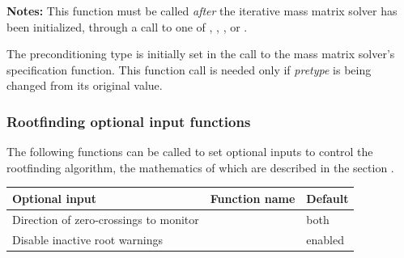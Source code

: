 \documentclass[letterpaper,10pt,english]{sphinxmanual}
\begin{document}
\begin{fulllineitems}
\textbf{Notes:} This function must be called \emph{after} the iterative mass
matrix solver has been initialized, through a call to one of
{\hyperref[c_interface/User_callable:c.ARKMassSpgmr]{\emph{}}}, {\hyperref[c_interface/User_callable:c.ARKMassSpbcg]{\emph{}}},
{\hyperref[c_interface/User_callable:c.ARKMassSptfqmr]{\emph{}}}, {\hyperref[c_interface/User_callable:c.ARKMassSpfgmr]{\emph{}}} or
{\hyperref[c_interface/User_callable:c.ARKMassPcg]{\emph{}}}.

The preconditioning type is initially set in the call to
the mass matrix solver's specification function.  This function
call is needed only if \emph{pretype} is being changed from its original
value.

\end{fulllineitems}



\subsubsection{Rootfinding optional input functions}
\label{c_interface/User_callable:rootfinding-optional-input-functions}
The following functions can be called to set optional inputs to
control the rootfinding algorithm, the mathematics of which are
described in the section {\hyperref[Mathematics:mathematics-rootfinding]{\emph{}}}.

\begin{tabulary}{\linewidth}{|L|L|L|}
\hline
\textsf{\relax 
Optional input
} & \textsf{\relax 
Function name
} & \textsf{\relax 
Default
}\\
\hline
Direction of zero-crossings to monitor
 & 
{\hyperref[c_interface/User_callable:c.ARKodeSetRootDirection]{\emph{}}}
 & 
both
\\
\hline
Disable inactive root warnings
 & 
{\hyperref[c_interface/User_callable:c.ARKodeSetNoInactiveRootWarn]{\emph{}}}
 & 
enabled
\\
\hline\end{tabulary}

\end{document}
